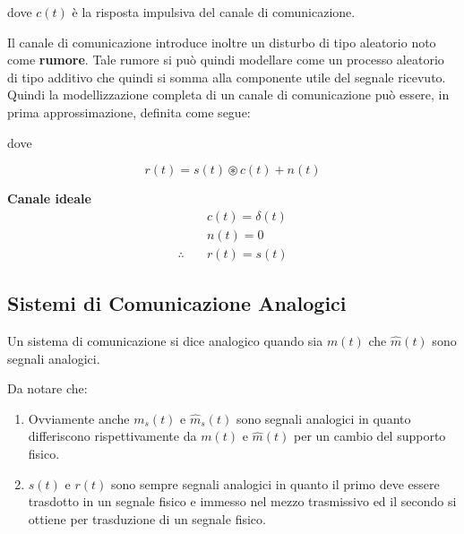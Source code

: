dove \( c(t) \) è la risposta impulsiva del canale di comunicazione.

\bigskip
Il canale di comunicazione introduce inoltre un disturbo di tipo aleatorio noto come \textbf{rumore}. Tale rumore si può quindi modellare come un processo aleatorio di tipo additivo che quindi si somma alla componente utile del segnale ricevuto.
Quindi la modellizzazione completa di un canale di comunicazione può essere, in prima approssimazione, definita come segue:

\begin{center}
\end{center}

dove

\[
r(t) = s(t) \circledast c(t) + n(t)
\]

\textbf{Canale ideale}
\begin{align*}
    & c(t) = \delta(t) \\
    & n(t) = 0 \\
    \therefore \quad & r(t) = s(t)
\end{align*}


\subsection*{Sistemi di Comunicazione Analogici}
Un sistema di comunicazione si dice analogico quando sia \( m(t) \) che \( \hat{m}(t) \) sono segnali analogici.

Da notare che:
\begin{enumerate}
    \item Ovviamente anche \( m_s(t) \) e \( \hat{m}_s(t) \) sono segnali analogici in quanto differiscono rispettivamente da \( m(t) \) e \( \hat{m}(t) \) per un cambio del supporto fisico.
    \item \( s(t) \) e \( r(t) \) sono sempre segnali analogici in quanto il primo deve essere trasdotto in un segnale fisico e immesso nel mezzo trasmissivo ed il secondo si ottiene per trasduzione di un segnale fisico.
\end{enumerate}

